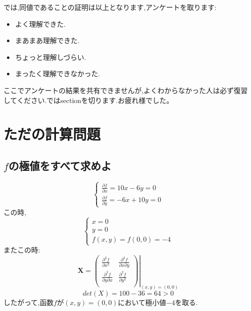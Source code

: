 \documentclass[dvipdfmx]{jsarticle}
\begin{document}
では,同値であることの証明は以上となります,アンケートを取ります:\\
\begin{center}
	\begin{itemize}
		\item よく理解できた.
		\item まあまあ理解できた.
		\item ちょっと理解しづらい.
		\item まったく理解できなかった.
	\end{itemize}
\end{center}
ここでアンケートの結果を共有できませんが,よくわからなかった人は必ず復習してください.ではsectionを切ります.お疲れ様でした。
\newpage
\section{ただの計算問題}
\subsection{$f$の極値をすべて求めよ}
$$
\begin{cases}
	\frac{\partial f}{\partial x} =10x -6y =0\\
	\frac{\partial f}{\partial y} =-6x +10y =0
\end{cases}
$$
この時,
$$
\begin{cases}
	x=0\\
	y=0\\
	f(x,y)=f(0,0)=-4
\end{cases}
$$
またこの時:
$$
\mathbf{X}=
\left.
\left(
\begin{array}{cc}
	\frac{\partial^2 f }{\partial x^2} & \frac{\partial^2 f }{\partial x \partial y} \\
	\frac{\partial^2 f }{\partial y \partial x} & \frac{\partial^2 f }{\partial y^2}\\
\end{array}
\right)
\right|_{(x,y) =(0,0)}
$$
$$
det(X)=100-36=64>0
$$
したがって,函数$f$が$(x,y)=(0,0)$において極小値$-4$を取る.
\end{document}
